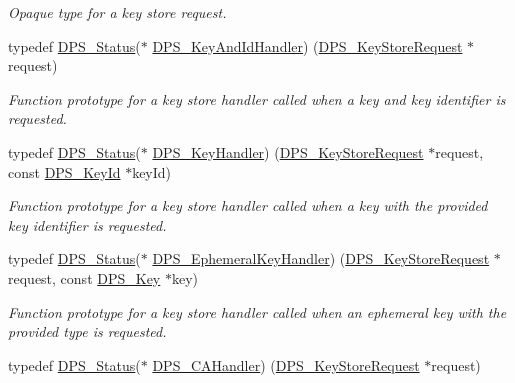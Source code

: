 \begin{DoxyCompactItemize}
\begin{DoxyCompactList}\small\item\em Opaque type for a key store request. \end{DoxyCompactList}\item 
typedef \hyperlink{group__status_ga30395a84d3cad9d4ec29848106415038}{D\+P\+S\+\_\+\+Status}($\ast$ \hyperlink{group__keystore_ga83d3ade4f4acd7d4385d606270ddfd29}{D\+P\+S\+\_\+\+Key\+And\+Id\+Handler}) (\hyperlink{group__keystore_ga7c3e50965b65334e9791780fa855ed16}{D\+P\+S\+\_\+\+Key\+Store\+Request} $\ast$request)
\begin{DoxyCompactList}\small\item\em Function prototype for a key store handler called when a key and key identifier is requested. \end{DoxyCompactList}\item 
typedef \hyperlink{group__status_ga30395a84d3cad9d4ec29848106415038}{D\+P\+S\+\_\+\+Status}($\ast$ \hyperlink{group__keystore_gaccf7e3d43bc1e586132d7f1ae03d02f7}{D\+P\+S\+\_\+\+Key\+Handler}) (\hyperlink{group__keystore_ga7c3e50965b65334e9791780fa855ed16}{D\+P\+S\+\_\+\+Key\+Store\+Request} $\ast$request, const \hyperlink{group__keystore_ga4345e29dd2ad5d7fd88a1e988787bd72}{D\+P\+S\+\_\+\+Key\+Id} $\ast$key\+Id)
\begin{DoxyCompactList}\small\item\em Function prototype for a key store handler called when a key with the provided key identifier is requested. \end{DoxyCompactList}\item 
typedef \hyperlink{group__status_ga30395a84d3cad9d4ec29848106415038}{D\+P\+S\+\_\+\+Status}($\ast$ \hyperlink{group__keystore_ga5b4cf102912eea802196d3e307c399ef}{D\+P\+S\+\_\+\+Ephemeral\+Key\+Handler}) (\hyperlink{group__keystore_ga7c3e50965b65334e9791780fa855ed16}{D\+P\+S\+\_\+\+Key\+Store\+Request} $\ast$request, const \hyperlink{group__keystore_gaa56a1429b6a1658e674eea558bdbbfc0}{D\+P\+S\+\_\+\+Key} $\ast$key)
\begin{DoxyCompactList}\small\item\em Function prototype for a key store handler called when an ephemeral key with the provided type is requested. \end{DoxyCompactList}\item 
typedef \hyperlink{group__status_ga30395a84d3cad9d4ec29848106415038}{D\+P\+S\+\_\+\+Status}($\ast$ \hyperlink{group__keystore_ga0acd005f34bca4fcbe1c460e2305ddae}{D\+P\+S\+\_\+\+C\+A\+Handler}) (\hyperlink{group__keystore_ga7c3e50965b65334e9791780fa855ed16}{D\+P\+S\+\_\+\+Key\+Store\+Request} $\ast$request)

\end{DoxyCompactItemize}
